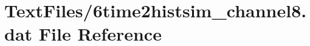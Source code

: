 \hypertarget{6time2histsim__channel8_8dat}{}\section{Text\+Files/6time2histsim\+\_\+channel8.dat File Reference}
\label{6time2histsim__channel8_8dat}
